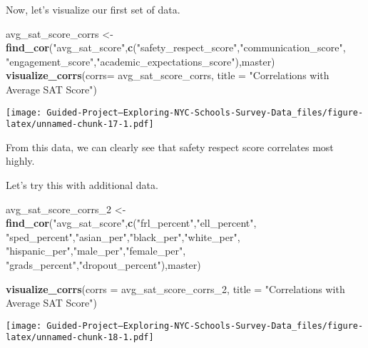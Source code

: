 \documentclass[]{article}
\newenvironment{Shaded}{\begin{snugshade}}{\end{snugshade}}
\newcommand{\DataTypeTok}[1]{\textcolor[rgb]{0.13,0.29,0.53}{#1}}
\newcommand{\DecValTok}[1]{\textcolor[rgb]{0.00,0.00,0.81}{#1}}
\newcommand{\KeywordTok}[1]{\textcolor[rgb]{0.13,0.29,0.53}{\textbf{#1}}}
\newcommand{\NormalTok}[1]{#1}
\newcommand{\StringTok}[1]{\textcolor[rgb]{0.31,0.60,0.02}{#1}}
\begin{document}
Now, let's visualize our first set of data.

\begin{Shaded}
\begin{Highlighting}[]
\NormalTok{avg_sat_score_corrs <-}\StringTok{ }\KeywordTok{find_cor}\NormalTok{(}\StringTok{"avg_sat_score"}\NormalTok{,}\KeywordTok{c}\NormalTok{(}\StringTok{"safety_respect_score"}\NormalTok{,}\StringTok{"communication_score"}\NormalTok{,}
                                                  \StringTok{"engagement_score"}\NormalTok{,}\StringTok{"academic_expectations_score"}\NormalTok{),master)}
\KeywordTok{visualize_corrs}\NormalTok{(}\DataTypeTok{corrs=}\NormalTok{ avg_sat_score_corrs, }\DataTypeTok{title =} \StringTok{"Correlations with Average SAT Score"}\NormalTok{)}
\end{Highlighting}
\end{Shaded}

\texttt{[image: Guided-Project--Exploring-NYC-Schools-Survey-Data\_files/figure-latex/unnamed-chunk-17-1.pdf]}

From this data, we can clearly see that safety respect score correlates
most highly.

Let's try this with additional data.

\begin{Shaded}
\begin{Highlighting}[]
\NormalTok{avg_sat_score_corrs_}\DecValTok{2}\NormalTok{ <-}\StringTok{ }\KeywordTok{find_cor}\NormalTok{(}\StringTok{"avg_sat_score"}\NormalTok{,}\KeywordTok{c}\NormalTok{(}\StringTok{"frl_percent"}\NormalTok{,}\StringTok{"ell_percent"}\NormalTok{,}
                                                    \StringTok{"sped_percent"}\NormalTok{,}\StringTok{"asian_per"}\NormalTok{,}\StringTok{"black_per"}\NormalTok{,}\StringTok{"white_per"}\NormalTok{,}
                                                    \StringTok{"hispanic_per"}\NormalTok{,}\StringTok{"male_per"}\NormalTok{,}\StringTok{"female_per"}\NormalTok{,}
                                                    \StringTok{"grads_percent"}\NormalTok{,}\StringTok{"dropout_percent"}\NormalTok{),master)}

\KeywordTok{visualize_corrs}\NormalTok{(}\DataTypeTok{corrs =}\NormalTok{ avg_sat_score_corrs_}\DecValTok{2}\NormalTok{, }\DataTypeTok{title =} \StringTok{"Correlations with Average SAT Score"}\NormalTok{)}
\end{Highlighting}
\end{Shaded}

\texttt{[image: Guided-Project--Exploring-NYC-Schools-Survey-Data\_files/figure-latex/unnamed-chunk-18-1.pdf]}
\end{document}
